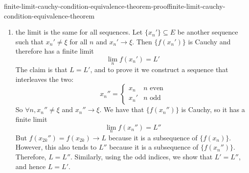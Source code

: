 \documentclass[preview]{standalone}
\begin{document}
\begin{snippetproof}{finite-limit-cauchy-condition-equivalence-theorem-proof}{finite-limit-cauchy-condition-equivalence-theorem}{}
{\begin{enumerate}
            \item the limit is the same for all sequences.
            Let \(\{x_n'\} \subseteq E\) be another sequence such that
            \(x_n' \neq \xi\) for all \(n\) and \(x_n' \to \xi\).
            Then \(\{f(x_n')\}\) is Cauchy and therefore has a finite limit
            \[
                \lim_n f(x_n') = L'
            \]
            The claim is that \(L=L'\), and to prove it we construct
            a sequence that interleaves the two:
            \[
                x_n'' = \begin{cases}
                    x_n & n \text{ even} \\
                    x_n' & n \text{ odd}
                \end{cases}
            \]
            So \(\forall n, x_n'' \neq \xi\) and \(x_n'' \to \xi\).
            We have that \(\{f(x_n'')\}\) is Cauchy, so it has a finite limit
            \[
                \lim_n f(x_n'') = L''
            \]
            But \(f(x_{2k}'') = f(x_{2k}) \to L\) because it is a subsequence of \(\{f(x_n)\}\).
            However, this also tends to \(L''\) because it is a subsequence of \(\{f(x_n'')\}\).
            Therefore, \(L = L''\).
            Similarly, using the odd indices, we show that \(L' = L''\),
            and hence \(L = L'\).
        \end{enumerate}
    }
\end{snippetproof}
\end{document}
